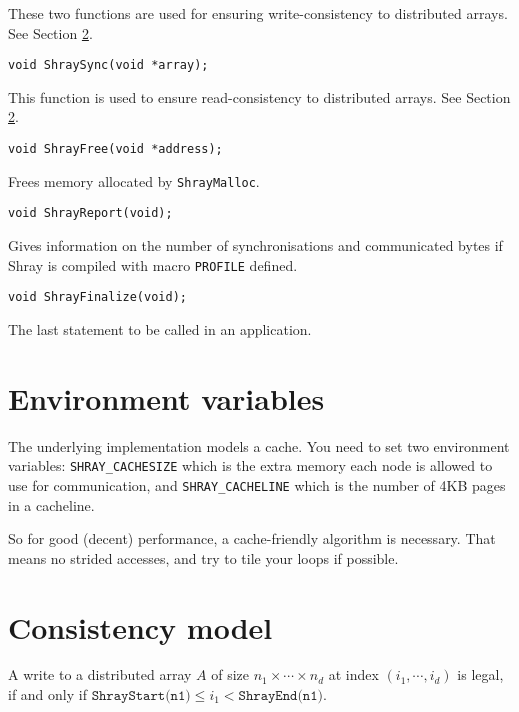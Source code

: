 \documentclass{article}
\begin{document}
These two functions are used for ensuring write-consistency to distributed arrays. See 
Section \ref{consistency}.

\begin{lstlisting}
void ShraySync(void *array);
\end{lstlisting}

This function is used to ensure read-consistency to distributed arrays. See Section 
\ref{consistency}.

\begin{lstlisting}
void ShrayFree(void *address);
\end{lstlisting}

Frees memory allocated by \texttt{ShrayMalloc}.

\begin{lstlisting}
void ShrayReport(void);
\end{lstlisting}

Gives information on the number of synchronisations and communicated bytes if Shray is compiled
with macro \texttt{PROFILE} defined.

\begin{lstlisting}
void ShrayFinalize(void);
\end{lstlisting}

The last statement to be called in an application.

\section{Environment variables}

The underlying implementation models a cache. You need to set two environment variables:
\texttt{SHRAY\_CACHESIZE} which is the extra memory each node is allowed to use for 
communication, and \texttt{SHRAY\_CACHELINE} which is the number of 4KB pages in a cacheline. 

\medskip

So for good (decent) performance, a cache-friendly 
algorithm is necessary. That means no strided accesses, and try to tile your loops if possible. 

\section{Consistency model}\label{consistency}

A write to a distributed array $A$ of size $n_1 \times \cdots \times n_d$ at index 
$(i_1, \cdots, i_d)$ is legal, if and only if 
$\texttt{ShrayStart(n1)} \leq i_1 < \texttt{ShrayEnd(n1)}$.
\end{document}
